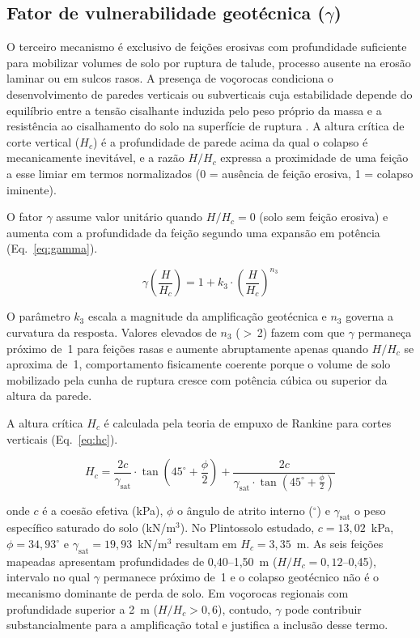 \documentclass[pdflatex,sn-basic]{sn-jnl}
\begin{document}
\subsection{Fator de vulnerabilidade geotécnica (\texorpdfstring{$\gamma$}{gama})}

O terceiro mecanismo é exclusivo de feições erosivas com profundidade suficiente para mobilizar volumes de solo por ruptura de talude, processo ausente na erosão laminar ou em sulcos rasos. A presença de voçorocas condiciona o desenvolvimento de paredes verticais ou subverticais cuja estabilidade depende do equilíbrio entre a tensão cisalhante induzida pelo peso próprio da massa e a resistência ao cisalhamento do solo na superfície de ruptura \citep{fredlund_rahardjo_1993}. A altura crítica de corte vertical ($H_c$) é a profundidade de parede acima da qual o colapso é mecanicamente inevitável, e a razão $H/H_c$ expressa a proximidade de uma feição a esse limiar em termos normalizados (0 = ausência de feição erosiva, 1 = colapso iminente).

O fator $\gamma$ assume valor unitário quando $H/H_c = 0$ (solo sem feição erosiva) e aumenta com a profundidade da feição segundo uma expansão em potência (Eq.~\ref{eq:gamma}).

\begin{equation}
\gamma\!\left(\frac{H}{H_c}\right) = 1 + k_3 \cdot \left(\frac{H}{H_c}\right)^{n_3}
\label{eq:gamma}
\end{equation}

O parâmetro $k_3$ escala a magnitude da amplificação geotécnica e $n_3$ governa a curvatura da resposta. Valores elevados de $n_3$ ($>$\,2) fazem com que $\gamma$ permaneça próximo de~1 para feições rasas e aumente abruptamente apenas quando $H/H_c$ se aproxima de~1, comportamento fisicamente coerente porque o volume de solo mobilizado pela cunha de ruptura cresce com potência cúbica ou superior da altura da parede.

A altura crítica $H_c$ é calculada pela teoria de empuxo de Rankine para cortes verticais (Eq.~\ref{eq:hc}).

\begin{equation}
H_c = \frac{2c}{\gamma_{\mathrm{sat}}} \cdot \tan\!\left(45^\circ + \frac{\phi}{2}\right) + \frac{2c}{\gamma_{\mathrm{sat}} \cdot \tan\!\left(45^\circ + \frac{\phi}{2}\right)}
\label{eq:hc}
\end{equation}

\noindent onde $c$ é a coesão efetiva (kPa), $\phi$ o ângulo de atrito interno ($^\circ$) e $\gamma_{\mathrm{sat}}$ o peso específico saturado do solo (kN/m$^3$). No Plintossolo estudado, $c = 13{,}02$~kPa, $\phi = 34{,}93^\circ$ e $\gamma_{\mathrm{sat}} = 19{,}93$~kN/m$^3$ resultam em $H_c = 3{,}35$~m. As seis feições mapeadas apresentam profundidades de 0,40--1,50~m ($H/H_c = 0{,}12$--0,45), intervalo no qual $\gamma$ permanece próximo de~1 e o colapso geotécnico não é o mecanismo dominante de perda de solo. Em voçorocas regionais com profundidade superior a 2~m ($H/H_c > 0{,}6$), contudo, $\gamma$ pode contribuir substancialmente para a amplificação total e justifica a inclusão desse termo.
\end{document}
